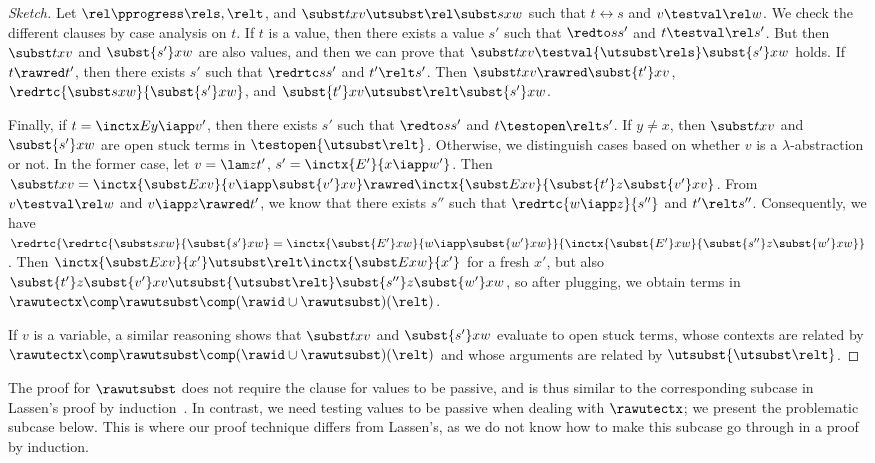\documentclass{lmcs}
\theoremstyle{defC}
\begin{document}
\begin{proof}[Sketch]
Let $\rel \pprogress \rels, \relt$, and $\subst t x v
\utsubst\rel \subst s x w$ such that $t \rel s$ and $v \testval\rel w$. We check
the different clauses by case analysis on $t$. If $t$ is a value, then there
exists a value $s'$ such that $\redto s {s'}$ and $t \testval\rel s'$. But then
$\subst t x v$ and $\subst {s'} x w$ are also values, and then we can prove that
$\subst t x v \testval{\utsubst\rels} \subst {s'} x w$ holds. If $t \rawred t'$,
then there exists $s'$ such that $\redrtc s {s'}$ and $t' \relt s'$. Then
$\subst t x v \rawred \subst {t'} x v$, $\redrtc {\subst s x w} {\subst {s'} x
  w}$, and $\subst {t'} x v \utsubst \relt \subst {s'} x w$.

Finally, if $t=\inctx E {y \iapp v'}$, then there exists $s'$ such that
$\redto s {s'}$ and $t \testopen\relt s'$. If $y \neq x$, then $\subst t x v$
and $\subst {s'} x w$ are open stuck terms in
$\testopen{\utsubst\relt}$. Otherwise, we distinguish cases based on whether $v$
is a $\lambda$-abstraction or not. In the former case, let $v = \lam z {t'}$,
$s' = \inctx {E'}{x \iapp w'}$. Then
$\subst t x v = \inctx {\subst E x v}{v \iapp \subst {v'} x v} \rawred \inctx
{\subst E x v}{\subst {t'} z {\subst {v'} x v} }$.  From $v \testval\rel w$ and
$v \iapp z \rawred t'$, we know that there exists $s''$ such that
$\redrtc {w \iapp z}{s''}$ and $t' \relt s''$.  Consequently, we have
$\redrtc{{\redrtc {\subst s x w}{\subst {s'} x w}}={\inctx {\subst {E'} x w}{w
      \iapp \subst{w'} x w }}}{\inctx {\subst {E'} x w}{\subst {s''} z
    {\subst{w'} x w}}}$.  Then
$\inctx {\subst E x v}{x'} \utsubst\relt \inctx {\subst E x w}{x'}$ for a fresh
$x'$, but also
$\subst {t'} z {\subst {v'} x v} \utsubst{\utsubst \relt} \subst {s''} z
{\subst{w'} x w}$, so after plugging, we obtain terms in
$\rawutectx \comp \rawutsubst \comp (\rawid \cup \rawutsubst)(\relt) $.

If $v$ is a variable, a similar reasoning shows that $\subst t x v$ and
$\subst {s'} x w$ evaluate to open stuck terms, whose contexts are related by
$\rawutectx \comp \rawutsubst \comp (\rawid \cup \rawutsubst)(\relt) $ and whose
arguments are related by $\utsubst{\utsubst \relt}$.
\end{proof}

The proof for $\rawutsubst$ does not require the clause for values to be
passive, and is thus similar to the corresponding subcase in Lassen's proof by
induction~\cite{Lassen:MFPS99}. In contrast, we need testing values to be
passive when dealing with $\rawutectx$; we present the problematic subcase
below. This is where our proof technique differs from Lassen's, as we do not
know how to make this subcase go through in a proof by induction.
\end{document}
